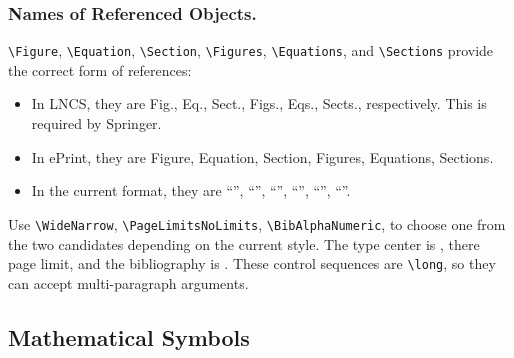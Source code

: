 \subsubsection{Names of Referenced Objects.}
\texttt{\textbackslash Figure},
\texttt{\textbackslash Equation},
\texttt{\textbackslash Section},
\texttt{\textbackslash Figures},
\texttt{\textbackslash Equations}, and
\texttt{\textbackslash Sections}
provide the correct form of references:
\begin{itemize}
\item
In LNCS, they are Fig., Eq., Sect., Figs., Eqs., Sects., respectively.
This is required by Springer.
\item
In ePrint, they are Figure, Equation, Section, Figures, Equations, Sections.
\item
In the current format, they are
``\Figure'', ``\Equation'', ``\Section'',
``\Figures'', ``\Equations'', ``\Sections''.
\end{itemize}
Use
\texttt{\textbackslash WideNarrow},
\texttt{\textbackslash PageLimitsNoLimits},
\texttt{\textbackslash BibAlphaNumeric},
to choose one from the two candidates depending on the current style.
The type center is ,
there  page limit,
and the bibliography is .
These control sequences are \texttt{\textbackslash long},
so they can accept multi-paragraph arguments.

\subsection{Mathematical Symbols}

